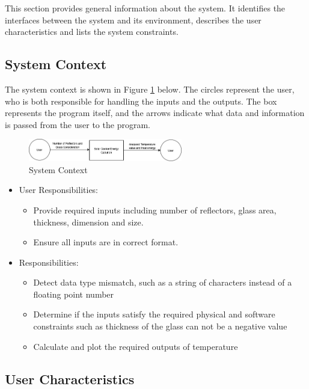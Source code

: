 \documentclass[12pt]{article}
\begin{document}
This section provides general information about the system.  It identifies the
interfaces between the system and its environment, describes the user
characteristics and lists the system constraints.  

\subsection{System Context}

The system context is shown in Figure \ref{Fig_SystemContext} below. The circles represent the user, who is both responsible for handling the inputs and the outputs. The box represents the program itself, and the arrows indicate what data and information is passed from the user to the program. 

\begin{figure}[h!]
\begin{center}
\includegraphics[width=0.6\textwidth]{SystemContext}
\caption{System Context}
\label{Fig_SystemContext} 
\end{center}
\end{figure}

\begin{itemize}
\item User Responsibilities:
\begin{itemize}
\item Provide required inputs including number of reflectors, glass area, thickness, dimension and size. 
\item Ensure all inputs are in correct format. 
\end{itemize}

\item Responsibilities:
\begin{itemize}
\item Detect data type mismatch, such as a string of characters instead of a
  floating point number
\item Determine if the inputs satisfy the required physical and software constraints such as thickness of the glass can not be a negative value
\item Calculate and plot the required outputs of temperature
\end{itemize}
\end{itemize}

\subsection{User Characteristics} \label{SecUserCharacteristics}
\end{document}

